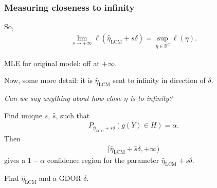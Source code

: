\documentclass[slidestop,compress, 10pt]{beamer}
\def\RR{{\mathbb R}}
\newcommand{\etaLCM}{\hat{\eta}_{\textrm{LCM}}}
\begin{document}
\frame
{
  \frametitle{Measuring closeness to infinity}  
So,
\begin{align*}
	\lim_{s \to +\infty} \ell(\etaLCM + s\delta) = \sup_{\eta \in \RR^d} \ell(\eta).
\end{align*}	

MLE for original model: off at $+\infty$.

Now, some more detail: it is $\etaLCM$ sent to infinity in direction of $\delta$.
\vspace{2mm}


\emph{Can we say anything about how close $\eta$ is to infinity?  }
\vspace{2mm}

\pause
Find unique $s$, $\hat{s}$, such that
\begin{align*}
		P_{\etaLCM + s \delta}( g(Y) \in H) = \alpha.
\end{align*}
\pause
Then
\begin{align*}
[ \etaLCM + \hat{s} \delta, + \infty)
\end{align*}
gives a $1 - \alpha$ confidence region for the parameter $\etaLCM + s \delta$.
\vspace{3mm}

\pause
\begin{block}{}
Find $\etaLCM$ and a GDOR $\delta$.
\end{block}
}
\end{document}

